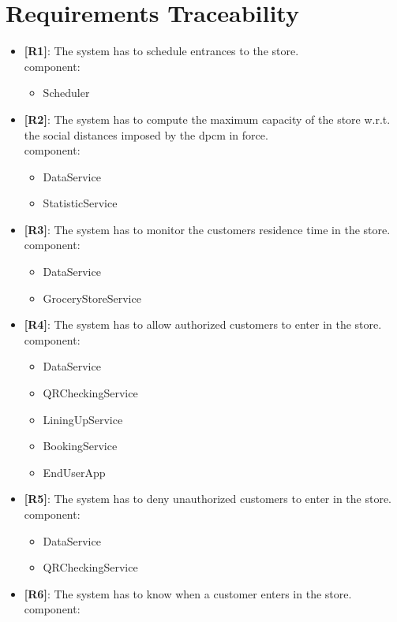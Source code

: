 \chapter{Requirements Traceability}
\begin{itemize}

	\item {\textbf{[R1]}}: The system has to schedule entrances to the store.\\
	component:
	\begin{itemize}
	\item Scheduler
	\end{itemize}
	\item {\textbf{[R2]}}: The system has to compute the maximum capacity of the store w.r.t. the social distances imposed by the \gls{dpcm} in force.\\
	component:
	\begin{itemize}
	\item DataService
	\item StatisticService
	\end{itemize}
	\item {\textbf{[R3]}}: The system has to monitor the customers residence time in the store.
component:
	\begin{itemize}
	\item DataService 
	\item GroceryStoreService
	\end{itemize}
	\item {\textbf{[R4]}}: The system has to allow authorized customers to enter in the store.
component:
	\begin{itemize}
	\item DataService 
	\item QRCheckingService
	\item LiningUpService
	\item BookingService
	\item EndUserApp
	\end{itemize}
	\item {\textbf{[R5]}}: The system has to deny unauthorized customers to enter in the store.
component:
	\begin{itemize}
	\item DataService
	\item QRCheckingService
	\end{itemize}
	\item {\textbf{[R6]}}: The system has to know when a customer enters in the store.
component:
	\begin{itemize}

\end{itemize}
\end{itemize}
